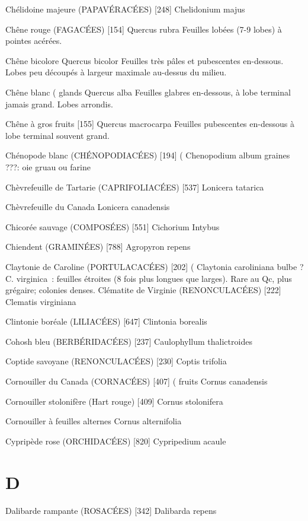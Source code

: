 Chélidoine majeure (PAPAVÉRACÉES)  [248]
				Chelidonium majus

Chêne rouge (FAGACÉES)  [154]
				Quercus rubra
Feuilles lobées (7-9 lobes) à pointes acérées.

Chêne bicolore
				Quercus bicolor
Feuilles très pâles et pubescentes en-dessous. Lobes peu découpés à largeur maximale au-dessus du milieu.

Chêne blanc							( glands
				Quercus alba
Feuilles glabres en-dessous, à lobe terminal jamais grand. Lobes arrondis.


Chêne à gros fruits  [155]
				Quercus macrocarpa
Feuilles pubescentes en-dessous à lobe terminal souvent grand.

Chénopode blanc (CHÉNOPODIACÉES)  [194]		(
				Chenopodium album			graines
???: oie							gruau ou farine

Chèvrefeuille de Tartarie (CAPRIFOLIACÉES)  [537]
				Lonicera tatarica

Chèvrefeuille du Canada 
				Lonicera canadensis

Chicorée sauvage (COMPOSÉES)  [551]
				Cichorium Intybus

Chiendent (GRAMINÉES)  [788]
				Agropyron repens

Claytonie de Caroline (PORTULACACÉES)  [202]			(
				Claytonia caroliniana			bulbe
? C. virginica : feuilles étroites (8 fois plus longues que larges).
Rare au Qc, plus grégaire; colonies denses.
Clématite de Virginie (RENONCULACÉES)  [222]
				Clematis virginiana

Clintonie boréale (LILIACÉES)  [647]
				Clintonia borealis

Cohosh bleu (BERBÉRIDACÉES)  [237]
				Caulophyllum thalictroides

Coptide savoyane (RENONCULACÉES)  [230]
				Coptis trifolia

Cornouiller du Canada (CORNACÉES)  [407]			( fruits
				Cornus canadensis

Cornouiller stolonifère (Hart rouge)  [409]
				Cornus stolonifera

Cornouiller à feuilles alternes
				Cornus alternifolia

Cypripède rose (ORCHIDACÉES)  [820]
				Cypripedium acaule

\chapter*{D}

Dalibarde rampante (ROSACÉES)  [342]
				Dalibarda repens

